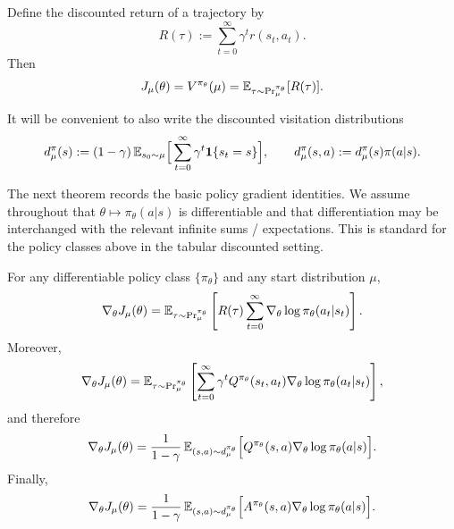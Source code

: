 Define the discounted return of a trajectory by
\[
R(\tau):=\sum_{t=0}^\infty \gamma^t r(s_t,a_t).
\]
Then
\[
J_\mu(\theta)=V^{\pi_\theta}(\mu)=\mathbb{E}_{\tau\sim {\Pr}^{\pi_\theta}_\mu}[R(\tau)].
\]

It will be convenient to also write the discounted visitation distributions
\[
d_\mu^\pi(s)
:=
(1-\gamma)\,\mathbb{E}_{s_0\sim\mu}\Big[\sum_{t=0}^\infty \gamma^t \mathbf{1}\{s_t=s\}\Big],
\qquad
d_\mu^\pi(s,a):=d_\mu^\pi(s)\pi(a|s).
\]

The next theorem records the basic policy gradient identities. We assume throughout
that $\theta\mapsto \pi_\theta(a|s)$ is differentiable and that differentiation may be
interchanged with the relevant infinite sums / expectations. This is standard for the
policy classes above in the tabular discounted setting.

\begin{theorem}\label{thm:pg_expressions}
For any differentiable policy class $\{\pi_\theta\}$ and any start distribution $\mu$,
\[
\nabla_\theta J_\mu(\theta)
=
\mathbb{E}_{\tau\sim {\Pr}^{\pi_\theta}_\mu}
\left[
R(\tau)\sum_{t=0}^\infty \nabla_\theta \log \pi_\theta(a_t|s_t)
\right].
\]
Moreover,
\[
\nabla_\theta J_\mu(\theta)
=
\mathbb{E}_{\tau\sim {\Pr}^{\pi_\theta}_\mu}
\left[
\sum_{t=0}^\infty \gamma^t Q^{\pi_\theta}(s_t,a_t)\nabla_\theta \log \pi_\theta(a_t|s_t)
\right],
\]
and therefore
\[
\nabla_\theta J_\mu(\theta)
=
\frac{1}{1-\gamma}\,
\mathbb{E}_{(s,a)\sim d_\mu^{\pi_\theta}}
\Big[
Q^{\pi_\theta}(s,a)\nabla_\theta \log \pi_\theta(a|s)
\Big].
\]
Finally,
\[
\nabla_\theta J_\mu(\theta)
=
\frac{1}{1-\gamma}\,
\mathbb{E}_{(s,a)\sim d_\mu^{\pi_\theta}}
\Big[
A^{\pi_\theta}(s,a)\nabla_\theta \log \pi_\theta(a|s)
\Big].
\]
\end{theorem}

